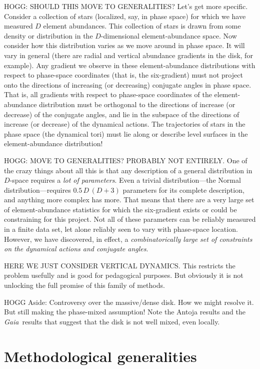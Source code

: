 \documentclass[modern]{aastex62}
\newcommand{\project}[1]{\textsl{#1}}
\newcommand{\gaia}{\project{Gaia}}
\begin{document}
HOGG: SHOULD THIS MOVE TO GENERALITIES? Let's get more specific.
Consider a collection of stars (localized, say, in phase space) for which we have
measured $D$ element abundances.
This collection of stars is drawn from some density or distribution in
the $D$-dimensional element-abundance space.
Now consider how this distribution varies as we move around in phase space.
It will vary in general (there are radial and vertical abundance gradients in the
disk, for example).
Any gradient we observe in these element-abundance distributions with respect to
phase-space coordinates (that is, the six-gradient) must not project
onto the directions of increasing (or decreasing) conjugate angles in phase space.
That is, all gradients with respect to phase-space coordinates
of the element-abundance distribution must be orthogonal to the
directions of increase (or decrease) of the conjugate angles, and lie in the subspace
of the directions of increase (or decrease) of the dynamical actions.
The trajectories of stars in the phase space (the dynamical tori) must lie along or
describe level surfaces in the element-abundance distribution!

HOGG: MOVE TO GENERALITIES? PROBABLY NOT ENTIRELY.
One of the crazy things about all this is that any description of a general distribution in $D$-space
requires a \emph{lot of parameters}.
Even a trivial distribution---the Normal distribution---requires $0.5\,D\,(D+3)$ parameters for its
complete description, and anything more complex has more.
That means that there are a very large set of element-abundance statistics for which the
six-gradient exists or could be constraining for this project.
Not all of these parameters can be reliably measured in a finite data set,
let alone reliably seen to vary with phase-space location.
However,
we have discovered, in effect, a \emph{combinatorically large set of constraints on the
dynamical actions and conjugate angles}.

HERE WE JUST CONSIDER VERTICAL DYNAMICS. This restricts the problem usefully and is good
for pedagogical purposes. But obviously it is not unlocking the full promise of this
family of methods.

HOGG Aside: Controversy over the massive/dense disk. How we might resolve it.
But still making the phase-mixed assumption! Note the Antoja results and the \gaia\ results
that suggest that the disk is not well mixed, even locally.

\section{Methodological generalities}
\end{document}

